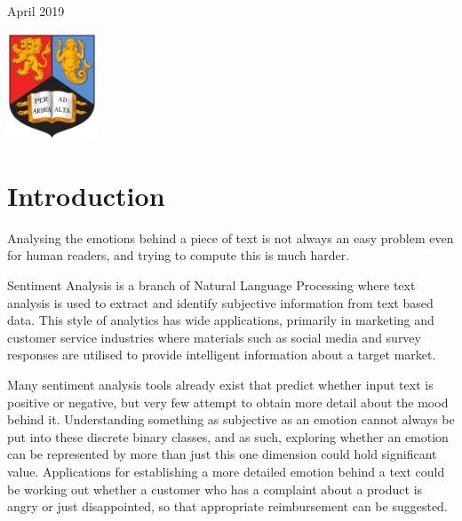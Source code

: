 \documentclass{article}
\begin{document}
\begin{titlepage}
	
	\vfill\vfill\vfill %
	
	{\large April  2019} %
	
	
	\includegraphics[width=0.2\textwidth]{litImgs/birmingham.png}\\[1cm] %
	 
	
	\vfill %
	
\end{titlepage}

\tableofcontents


\pagebreak

\section{Introduction}

Analysing the emotions behind a piece of text is not always an easy problem even for human readers, and trying to compute this is much harder.

Sentiment Analysis is a branch of Natural Language Processing where text analysis is used to extract and identify subjective information from text based data. This style of analytics has wide applications, primarily in marketing and customer service industries where materials such as social media and survey responses are utilised to provide intelligent information about a target market. 

Many sentiment analysis tools already exist that predict whether input text is positive or negative, but very few attempt to obtain more detail about the mood behind it. Understanding something as subjective as an emotion cannot always be put into these discrete binary classes, and as such, exploring whether an emotion can be represented by more than just this one dimension could hold significant value. Applications for establishing a more detailed emotion behind a text could be working out whether a customer who has a complaint about a product is angry or just disappointed, so that appropriate reimbursement can be suggested.
\end{document}
